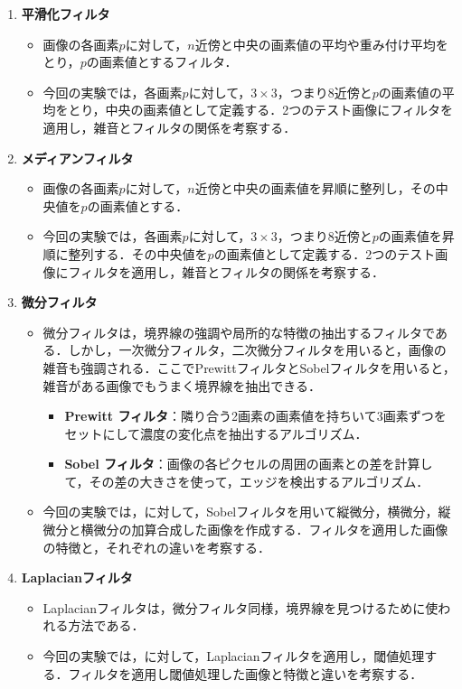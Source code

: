 \begin{enumerate}
    \item \textbf{平滑化フィルタ}
          \begin{itemize}
              \item 画像の各画素\(p\)に対して，\(n\)近傍と中央の画素値の平均や重み付け平均をとり，\(p\)の画素値とするフィルタ．
              \item 今回の実験では，各画素\(p\)に対して，\(3\times 3\)，つまり8近傍と\(p\)の画素値の平均をとり，中央の画素値として定義する．2つのテスト画像にフィルタを適用し，雑音とフィルタの関係を考察する．
          \end{itemize}
    \item \textbf{メディアンフィルタ}
          \begin{itemize}
              \item 画像の各画素\(p\)に対して，\(n\)近傍と中央の画素値を昇順に整列し，その中央値を\(p\)の画素値とする．
              \item 今回の実験では，各画素\(p\)に対して，\(3\times 3\)，つまり8近傍と\(p\)の画素値を昇順に整列する．その中央値を\(p\)の画素値として定義する．2つのテスト画像にフィルタを適用し，雑音とフィルタの関係を考察する．
          \end{itemize}
    \item \textbf{微分フィルタ}
          \begin{itemize}
              \item 微分フィルタは，境界線の強調や局所的な特徴の抽出するフィルタである．しかし，一次微分フィルタ，二次微分フィルタを用いると，画像の雑音も強調される．ここでPrewittフィルタとSobelフィルタを用いると，雑音がある画像でもうまく境界線を抽出できる\cite[p.87]{画像処理}．
                    \begin{itemize}
                        \item \textbf{Prewitt フィルタ}：隣り合う2画素の画素値を持ちいて3画素ずつをセットにして濃度の変化点を抽出するアルゴリズム\cite[p.87]{画像処理}．
                        \item \textbf{Sobel フィルタ}：画像の各ピクセルの周囲の画素との差を計算して，その差の大きさを使って，エッジを検出するアルゴリズム．
                    \end{itemize}
              \item 今回の実験では，\originimg に対して，Sobelフィルタを用いて縦微分，横微分，縦微分と横微分の加算合成した画像を作成する．フィルタを適用した画像の特徴と，それぞれの違いを考察する．
          \end{itemize}
    \item \textbf{Laplacianフィルタ}
          \begin{itemize}
              \item Laplacianフィルタは，微分フィルタ同様，境界線を見つけるために使われる方法である．
              \item 今回の実験では，\originimg に対して，Laplacianフィルタを適用し，閾値処理する．フィルタを適用し閾値処理した画像と特徴と違いを考察する．
          \end{itemize}
\end{enumerate}
